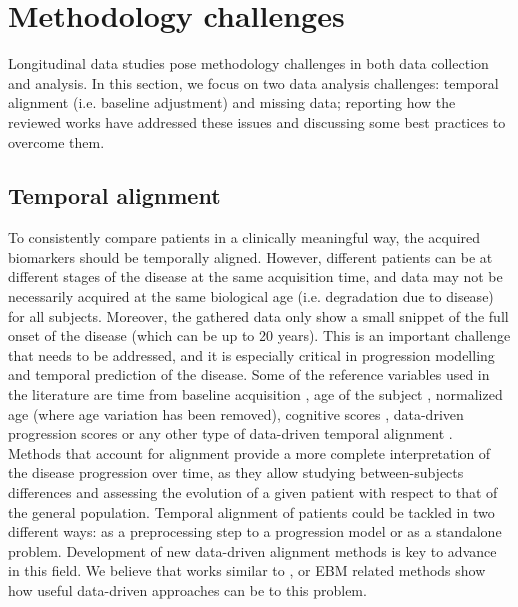 \section{Methodology challenges}
\label{sec:missing}

Longitudinal data studies pose methodology challenges in both data collection and analysis. In this section, we focus on two data analysis challenges: temporal alignment (i.e. baseline adjustment) and missing data; reporting how the reviewed works have addressed these issues and discussing some best practices to overcome them.

\subsection{Temporal alignment}
\label{subsec:tempalig}

To consistently compare patients in a clinically meaningful way, the acquired biomarkers should be temporally aligned. However, different patients can be at different stages of the disease at the same acquisition time, and data may not be necessarily acquired at the same biological age (i.e. degradation due to disease) for all subjects. Moreover, the gathered data only show a small snippet of the full onset of the disease (which can be up to 20 years). This is an important challenge that needs to be addressed, and it is especially critical in progression modelling and temporal prediction of the disease. Some of the reference variables used in the literature are time from baseline acquisition \cite{Donohue14,Franke2012}, age of the subject \cite{Bateman2012}, normalized age \cite{Lorenzi2014} (where age variation has been removed), cognitive scores \cite{Guerrero2016,Yang2011}, data-driven progression scores \cite{Casanova2018,Clark2012,Davatzikos2009,Jedynak2012,Schmidt-Richberg2015} or any other type of data-driven temporal alignment \cite{Goyal2018}. \\

Methods that account for alignment provide a more complete interpretation of the disease progression over time, as they allow studying between-subjects differences and assessing the evolution of a given patient with respect to that of the general population. Temporal alignment of patients could be tackled in two different ways: as a preprocessing step to a progression model or as a standalone problem. Development of new data-driven alignment methods is key to advance in this field. We believe that works similar to \cite{Bone2018,Goyal2018}, or EBM related methods \cite{Fonteijn2012,Huang2012,Young2014} show how useful data-driven approaches can be to this problem. \\

